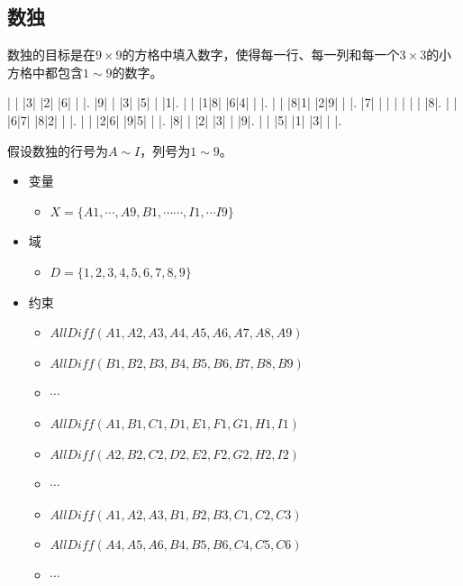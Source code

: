 \subsection{数独}

数独的目标是在$ 9 \times 9 $的方格中填入数字，使得每一行、每一列和每一个$ 3 \times 3 $的小方格中都包含$ 1 \sim 9 $的数字。\\

\begin{sudoku}
    | | |3| |2| |6| | |.
    |9| | |3| |5| | |1|.
    | | |1|8| |6|4| | |.
    | | |8|1| |2|9| | |.
    |7| | | | | | | |8|.
    | | |6|7| |8|2| | |.
    | | |2|6| |9|5| | |.
    |8| | |2| |3| | |9|.
    | | |5| |1| |3| | |.
\end{sudoku}

假设数独的行号为$ A \sim I $，列号为$ 1 \sim 9 $。

\begin{itemize}
    \item 变量
          \begin{itemize}
              \item $ X = \{A1, \cdots, A9, B1, \cdots \cdots, I1, \cdots I9\} $
          \end{itemize}
    \item 域
          \begin{itemize}
              \item $ D = \{1, 2, 3, 4, 5, 6, 7, 8, 9\} $
          \end{itemize}
    \item 约束
          \begin{itemize}
              \item $ AllDiff(A1, A2, A3, A4, A5, A6, A7, A8, A9) $
              \item $ AllDiff(B1, B2, B3, B4, B5, B6, B7, B8, B9) $
              \item $ \cdots $
              \item $ AllDiff(A1, B1, C1, D1, E1, F1, G1, H1, I1) $
              \item $ AllDiff(A2, B2, C2, D2, E2, F2, G2, H2, I2) $
              \item $ \cdots $
              \item $ AllDiff(A1, A2, A3, B1, B2, B3, C1, C2, C3) $
              \item $ AllDiff(A4, A5, A6, B4, B5, B6, C4, C5, C6) $
              \item $ \cdots $
          \end{itemize}
\end{itemize}

